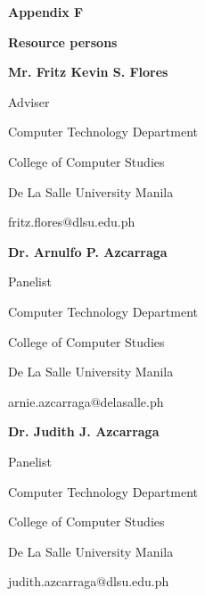 %
%
%                 

\textbf{\Huge Appendix F}
\bigskip

\textbf{\LARGE Resource persons}

\bigskip
\textbf{Mr. Fritz Kevin S. Flores}

Adviser

Computer Technology Department

College of Computer Studies

{De La Salle University Manila}

fritz.flores$@$dlsu.edu.ph

\bigskip
\textbf{Dr. Arnulfo P. Azcarraga}

Panelist

Computer Technology Department

College of Computer Studies

{De La Salle University Manila}

arnie.azcarraga$@$delasalle.ph

\bigskip
\textbf{Dr. Judith J. Azcarraga}

Panelist

Computer Technology Department

College of Computer Studies

{De La Salle University Manila}

judith.azcarraga$@$dlsu.edu.ph

